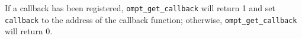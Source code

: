 \documentclass{article}
\begin{document}
{\noindent
If a callback has been registered,  \verb|ompt_get_callback|  will return 1 and set {\tt callback} to the address of the callback function; otherwise, \verb|ompt_get_callback| will return 0.

}
\end{document}

